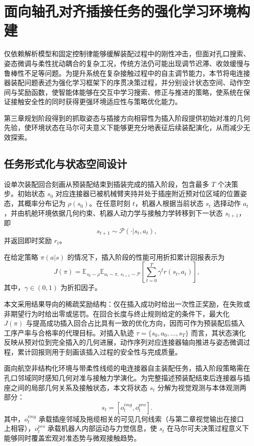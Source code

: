 \section{面向轴孔对齐插接任务的强化学习环境构建}
仅依赖解析模型和固定控制律能够缓解装配过程中的刚性冲击，但面对孔口搜索、姿态微调与柔性扰动耦合的复杂工况，传统方法仍可能出现调节迟滞、收敛缓慢与鲁棒性不足等问题。为提升系统在复杂接触过程中的自主调节能力，本节将电连接器装配问题表述为强化学习框架下的序贯决策过程，并分别设计状态空间、动作空间与奖励函数，使智能体能够在交互中学习搜索、修正与推进的策略，使系统在保证接触安全性的同时获得更强环境适应性与策略优化能力。

第三章规划阶段得到的抓取姿态与插接方向相容性为插入阶段提供初始对准的几何先验，使环境状态在马尔可夫意义下能够更充分地表征后续装配演化，从而减少无效探索。

\subsection{任务形式化与状态空间设计}
设单次装配回合刻画从预装配结束到插装完成的插入阶段，包含最多 $T$ 个决策步。初始状态 $s_0$ 对应连接器已被机械臂夹持并处于插座附近预对位区域的位置姿态，其概率分布记为 $\rho(s_0)$。在任意时刻 $t$，机器人根据当前状态 $s_t$ 选择动作 $a_t$，并由机舱环境依据几何约束、机器人动力学与接触力学转移到下一状态 $s_{t+1}$，即
\begin{equation}
s_{t+1}\sim \mathcal{P}(\cdot|s_t,a_t),
\end{equation}
并返回即时奖励 $r_t$。

在给定策略 $\pi(a|s)$ 的情况下，插入阶段的性能可用折扣累计回报表示为
\begin{equation}
J(\pi)=\mathbb{E}_{s_0\sim\rho}\mathbb{E}_{a_t\sim \pi,\, s_{t+1}\sim \mathcal{P}}\left[\sum_{t=0}^{T}\gamma^t r(s_t,a_t)\right],
\end{equation}
其中，$\gamma\in(0,1)$ 为折扣因子。

本文采用结果导向的稀疏奖励结构：仅在插入成功时给出一次性正奖励，在失败或非期望行为时给出零或惩罚。在回合长度与终止规则给定的条件下，最大化 $J(\pi)$ 与提高成功插入回合占比具有一致的优化方向，因而可作为预装配后插入工序产率与合格率的代理目标。对插入轨迹 $\tau=\{s_0,a_0,\ldots,s_T\}$ 而言，其状态演化反映从预对位到完全插入的几何进展，动作序列对应连接器轴向推进与姿态微调过程，累计回报则用于刻画该插入过程的安全性与完成质量。

面向航空非结构化环境与带柔性线缆的电连接器自主装配任务，插入阶段策略需在孔口邻域同时感知几何对准与接触力学演化。为完整描述预装配结束后连接器与插座之间的局部几何关系及接触状态，本文将状态 $s_t$ 分解为视觉观测与本体观测两部分：
\begin{equation}
s_t=[o_t^{img},o_t^{pro}].
\end{equation}
其中，$o_t^{img}$ 承载插座邻域及拖缆相关的可见几何线索（与第二章视觉输出在接口上相容），$o_t^{pro}$ 承载机器人内部运动与力觉信息，使 $s_t$ 在马尔可夫决策过程意义下能够同时覆盖宏观对准态势与微观接触趋势。

